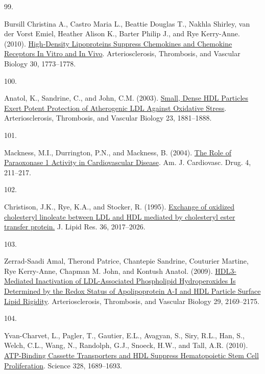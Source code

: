 \documentclass[
]{article}
\newlength{\cslhangindent}
\newlength{\csllabelwidth}
\newlength{\cslentryspacingunit} %
\newenvironment{CSLReferences}[2] %
 {%
  \setlength{\parindent}{0pt}
  \ifodd #1
  \let\oldpar\par
  \def\par{\hangindent=\cslhangindent\oldpar}
  \fi
  \setlength{\parskip}{#2\cslentryspacingunit}
 }%
 {}
\newcommand{\CSLLeftMargin}[1]{\parbox[t]{\csllabelwidth}{#1}}
\newcommand{\CSLRightInline}[1]{\parbox[t]{\linewidth - \csllabelwidth}{#1}\break}
\begin{document}
\begin{CSLReferences}{0}{0}
\leavevmode{}%
\CSLLeftMargin{99. }
\CSLRightInline{Bursill Christina A., Castro Maria L., Beattie Douglas T., Nakhla Shirley, van der Vorst Emiel, Heather Alison K., Barter Philip J., and Rye Kerry-Anne. (2010). \href{https://doi.org/10.1161/ATVBAHA.110.211342}{High-{Density Lipoproteins Suppress Chemokines} and {Chemokine Receptors In Vitro} and {In Vivo}}. Arteriosclerosis, Thrombosis, and Vascular Biology 30, 1773--1778.}

\leavevmode{}%
\CSLLeftMargin{100. }
\CSLRightInline{Anatol, K., Sandrine, C., and John, C.M. (2003). \href{https://doi.org/10.1161/01.ATV.0000091338.93223.E8}{Small, {Dense HDL Particles Exert Potent Protection} of {Atherogenic LDL Against Oxidative Stress}}. Arteriosclerosis, Thrombosis, and Vascular Biology 23, 1881--1888.}

\leavevmode{}%
\CSLLeftMargin{101. }
\CSLRightInline{Mackness, M.I., Durrington, P.N., and Mackness, B. (2004). \href{https://doi.org/10.2165/00129784-200404040-00002}{The {Role} of {Paraoxonase} 1 {Activity} in {Cardiovascular Disease}}. Am. J. Cardiovasc. Drug. 4, 211--217.}

\leavevmode{}%
\CSLLeftMargin{102. }
\CSLRightInline{Christison, J.K., Rye, K.A., and Stocker, R. (1995). \href{https://doi.org/10.1016/S0022-2275(20)41119-8}{Exchange of oxidized cholesteryl linoleate between {LDL} and {HDL} mediated by cholesteryl ester transfer protein.} J. Lipid Res. 36, 2017--2026.}

\leavevmode{}%
\CSLLeftMargin{103. }
\CSLRightInline{Zerrad-Saadi Amal, Therond Patrice, Chantepie Sandrine, Couturier Martine, Rye Kerry-Anne, Chapman M. John, and Kontush Anatol. (2009). \href{https://doi.org/10.1161/ATVBAHA.109.194555}{{HDL3-Mediated Inactivation} of {LDL-Associated Phospholipid Hydroperoxides Is Determined} by the {Redox Status} of {Apolipoprotein A-I} and {HDL Particle Surface Lipid Rigidity}}. Arteriosclerosis, Thrombosis, and Vascular Biology 29, 2169--2175.}

\leavevmode{}%
\CSLLeftMargin{104. }
\CSLRightInline{Yvan-Charvet, L., Pagler, T., Gautier, E.L., Avagyan, S., Siry, R.L., Han, S., Welch, C.L., Wang, N., Randolph, G.J., Snoeck, H.W., and Tall, A.R. (2010). \href{https://doi.org/10.1126/science.1189731}{{ATP-Binding Cassette Transporters} and {HDL Suppress Hematopoietic Stem Cell Proliferation}}. Science 328, 1689--1693.}


\end{CSLReferences}
\end{document}
